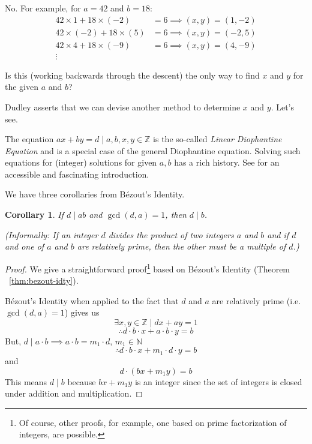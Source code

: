 \documentclass[english,notitlepage,smartquotes]{hgbreport}
\theoremstyle{definition}
\theoremstyle{remark}
\theoremstyle{plain}
\newtheorem{corollary}{Corollary}[theorem]
\begin{document}
No. For example, for $a=42$ and $b=18$:
\begin{align*}
42\times 1+18\times(-2)&=6\implies(x,y)=(1,-2)\\
42\times(-2)+18\times(5)&=6\implies(x,y)=(-2,5)\\
42\times 4+18\times(-9)&=6\implies(x,y)=(4,-9)\\
\vdots
\end{align*}


Is this (working backwards through the descent) the only way to find $x$ and $y$ for the given $a$ and $b$?

Dudley asserts that we can devise another method to determine $x$ and $y$. Let's see.

The equation $ax+by=d\mid a,b,x,y\in\mathbb{Z}$ is the so-called \emph{Linear Diophantine Equation} \cite{Dio} and is a special case of the general Diophantine equation. Solving such equations for (integer) solutions for given $a,b$ has a rich history. See \cite{MartinHershSciAm} for an accessible and fascinating introduction.

We have three corollaries from B\'ezout's Identity.
\begin{corollary}
\label{cor:ddivab}
If $d\mid ab$ and $\gcd(d,a)=1$, then $d\mid b$.

(Informally: If an integer $d$ divides the product of two integers $a$ and $b$ and if $d$ and one of $a$ and $b$ are relatively prime, then the other must be a multiple of $d$.)
\end{corollary}
\begin{proof}
We give a straightforward proof\footnote{Of course, other proofs, for example, one based on prime factorization of integers, are possible.} based on B\'ezout's Identity (Theorem ~\ref{thm:bezout-idty}).

B\'ezout's Identity when applied to the fact that $d$ and $a$ are relatively prime (i.e. $\gcd(d,a)=1$) gives us
$$
\exists x,y\in\mathbb{Z}\mid dx+ay=1
$$
$$
\therefore d\cdot b\cdot x+a\cdot b\cdot y=b
$$
But, $d\mid a\cdot b\implies a\cdot b=m_1\cdot d$, $m_1\in\mathbb{N}$
$$
\therefore d\cdot b\cdot x+m_1\cdot d\cdot y=b
$$
and
$$
d\cdot(bx+m_1y)=b
$$
This means $d\mid b$ because $bx+m_1y$ is an integer since the set of integers is closed under addition and multiplication.
\end{proof}
\end{document}
